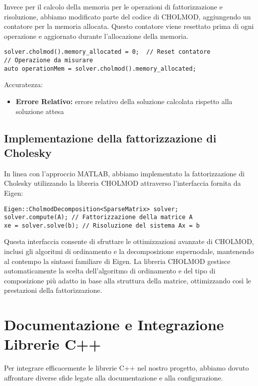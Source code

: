 Invece per il calcolo della memoria per le operazioni di fattorizzazione e risoluzione, abbiamo modificato parte del codice di CHOLMOD, 
aggiungendo un contatore per la memoria allocata. Questo contatore viene resettato prima di ogni operazione e 
aggiornato durante l'allocazione della memoria.

\begin{verbatim}
solver.cholmod().memory_allocated = 0;  // Reset contatore
// Operazione da misurare
auto operationMem = solver.cholmod().memory_allocated;
\end{verbatim}

Accuratezza:
\begin{itemize}
    \item \textbf{Errore Relativo:} errore relativo della soluzione calcolata rispetto alla soluzione attesa
\end{itemize}

\subsection{Implementazione della fattorizzazione di Cholesky}

In linea con l'approccio MATLAB, abbiamo implementato la fattorizzazione di Cholesky utilizzando la libreria CHOLMOD attraverso 
l'interfaccia fornita da Eigen:

\begin{verbatim}
Eigen::CholmodDecomposition<SparseMatrix> solver;
solver.compute(A); // Fattorizzazione della matrice A
xe = solver.solve(b); // Risoluzione del sistema Ax = b
\end{verbatim}

Questa interfaccia consente di sfruttare le ottimizzazioni avanzate di CHOLMOD, inclusi gli algoritmi di ordinamento e 
la decomposizione supernodale, mantenendo al contempo la sintassi familiare di Eigen. La libreria CHOLMOD gestisce 
automaticamente la scelta dell'algoritmo di ordinamento e del tipo di composizione più adatto in base alla struttura della matrice, 
ottimizzando così le prestazioni della fattorizzazione.

\section{Documentazione e Integrazione Librerie C++}

Per integrare efficacemente le librerie C++ nel nostro progetto, abbiamo dovuto affrontare diverse sfide legate alla documentazione e
alla configurazione.

